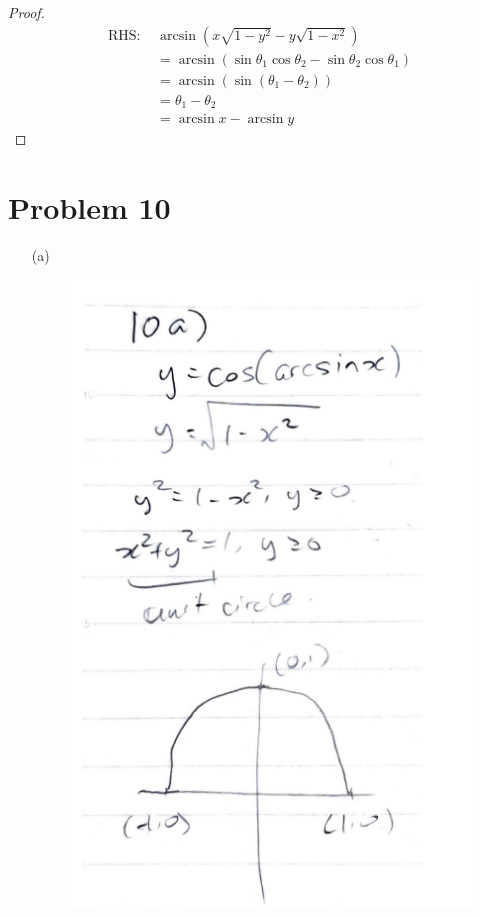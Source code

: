 \documentclass{article}
\begin{document}
\begin{proof}
	\begin{align*}
		\text{RHS: }&\arcsin\left(x\sqrt{1-y^2}-y\sqrt{1-x^2}\right) \\
		&=\arcsin\left(\sin\theta_1\cos\theta_2-\sin\theta_2\cos\theta_1\right) \\
		&=\arcsin\left(\sin\left(\theta_1-\theta_2\right)\right) \\
		&=\theta_1-\theta_2\ \\
		&=\arcsin x-\arcsin y
	\end{align*}
\end{proof}

\pagebreak

\section*{Problem 10}
\begin{multicols}{2}
\begin{itemize}
	\item[(a)]
	\phantom{}
	\begin{figure}[H]
		\includegraphics[height=0.5\textheight]{ps34q10a.png}
	\end{figure}


\end{itemize}
\end{multicols}
\end{document}

